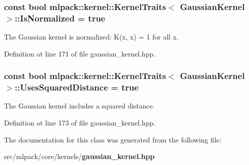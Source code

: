 \subsubsection[{Is\+Normalized}]{\setlength{\rightskip}{0pt plus 5cm}const bool {\bf mlpack\+::kernel\+::\+Kernel\+Traits}$<$ {\bf Gaussian\+Kernel} $>$\+::Is\+Normalized = true\hspace{0.3cm}{\ttfamily [static]}}\label{classmlpack_1_1kernel_1_1KernelTraits_3_01GaussianKernel_01_4_a05bdf2730803d7205420dc6d3fd35f87}


The Gaussian kernel is normalized\+: K(x, x) = 1 for all x. 



Definition at line 171 of file gaussian\+\_\+kernel.\+hpp.

\subsubsection[{Uses\+Squared\+Distance}]{\setlength{\rightskip}{0pt plus 5cm}const bool {\bf mlpack\+::kernel\+::\+Kernel\+Traits}$<$ {\bf Gaussian\+Kernel} $>$\+::Uses\+Squared\+Distance = true\hspace{0.3cm}{\ttfamily [static]}}\label{classmlpack_1_1kernel_1_1KernelTraits_3_01GaussianKernel_01_4_a860c5920304139c60a51fe7bb84f0a81}


The Gaussian kernel includes a squared distance. 



Definition at line 173 of file gaussian\+\_\+kernel.\+hpp.



The documentation for this class was generated from the following file\+:\begin{DoxyCompactItemize}
\item 
src/mlpack/core/kernels/{\bf gaussian\+\_\+kernel.\+hpp}\end{DoxyCompactItemize}
